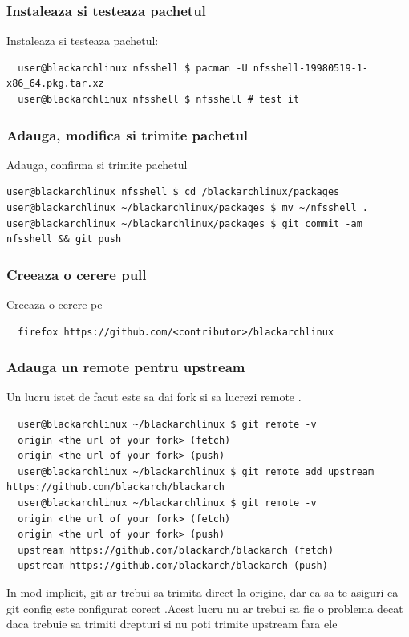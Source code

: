 \documentclass[a4paper, oneside, 11pt]{book}
\def\href#1#2{\htmladdnormallink{#2}{#1}}
\begin{document}
\subsubsection{Instaleaza si testeaza pachetul}
Instaleaza si testeaza pachetul:
\begin{lstlisting}
  user@blackarchlinux nfsshell $ pacman -U nfsshell-19980519-1-x86_64.pkg.tar.xz
  user@blackarchlinux nfsshell $ nfsshell # test it
\end{lstlisting}

\subsubsection{Adauga, modifica si trimite pachetul}
Adauga, confirma si trimite pachetul
\begin{lstlisting}user@blackarchlinux nfsshell $ cd /blackarchlinux/packages
user@blackarchlinux ~/blackarchlinux/packages $ mv ~/nfsshell .
user@blackarchlinux ~/blackarchlinux/packages $ git commit -am nfsshell && git push
\end{lstlisting}

\subsubsection{Creeaza o cerere pull }
Creeaza o cerere pe \href{https://github.com/}{github.com}
\begin{lstlisting}
  firefox https://github.com/<contributor>/blackarchlinux
\end{lstlisting}

\subsubsection{Adauga un remote pentru upstream}
Un lucru istet de facut este sa dai fork si sa lucrezi remote .
\begin{lstlisting}
  user@blackarchlinux ~/blackarchlinux $ git remote -v
  origin <the url of your fork> (fetch)
  origin <the url of your fork> (push)
  user@blackarchlinux ~/blackarchlinux $ git remote add upstream https://github.com/blackarch/blackarch
  user@blackarchlinux ~/blackarchlinux $ git remote -v
  origin <the url of your fork> (fetch)
  origin <the url of your fork> (push)
  upstream https://github.com/blackarch/blackarch (fetch)
  upstream https://github.com/blackarch/blackarch (push)
\end{lstlisting}

In mod implicit, git ar trebui sa trimita direct la origine, dar ca sa te asiguri ca git config este configurat corect .Acest lucru nu ar trebui sa fie o problema decat daca trebuie sa trimiti drepturi si nu poti trimite upstream fara ele
\end{document}
